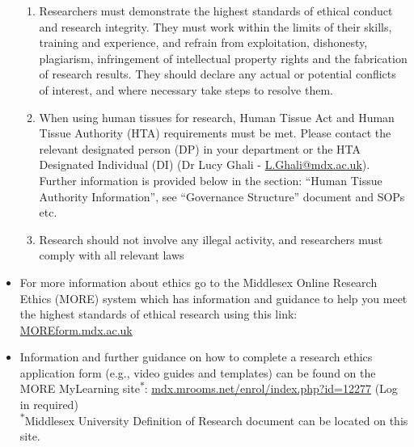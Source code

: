 \documentclass{MDXHandbook}
\begin{document}
\begin{itemize}
\begin{enumerate}
		\item Researchers must demonstrate the highest standards of ethical conduct and research integrity. They must work within the limits of their skills, training and experience, and refrain from exploitation, dishonesty, plagiarism, infringement of intellectual property rights and the fabrication of research results. They should declare any actual or potential conflicts of interest, and where necessary take steps to resolve them. 
		\item When using human tissues for research, Human Tissue Act and Human Tissue Authority (HTA) requirements must be met. Please contact the relevant designated person (DP) in your department or the HTA Designated Individual (DI) (Dr Lucy Ghali - \href{mailto:L.Ghali@mdx.ac.uk}{L.Ghali@mdx.ac.uk}). Further information is provided below in the section: ``Human Tissue Authority Information'', see ``Governance Structure'' document and SOPs etc.
		\item Research should not involve any illegal activity, and researchers must comply with all relevant laws
	\end{enumerate}
	\item For more information about ethics go to the Middlesex Online Research Ethics (MORE) system which has information and guidance to help you meet the highest standards of ethical research using this link: \url{MOREform.mdx.ac.uk}
	\item Information and further guidance on how to complete a research ethics application form (e.g., video guides and templates) can be found on the MORE MyLearning site\textsuperscript{$\ast$}: \url{mdx.mrooms.net/enrol/index.php?id=12277} (Log in required)\\
\textsuperscript{$\ast$}Middlesex University Definition of Research document can be located on this site.
\end{itemize}
\end{document}
